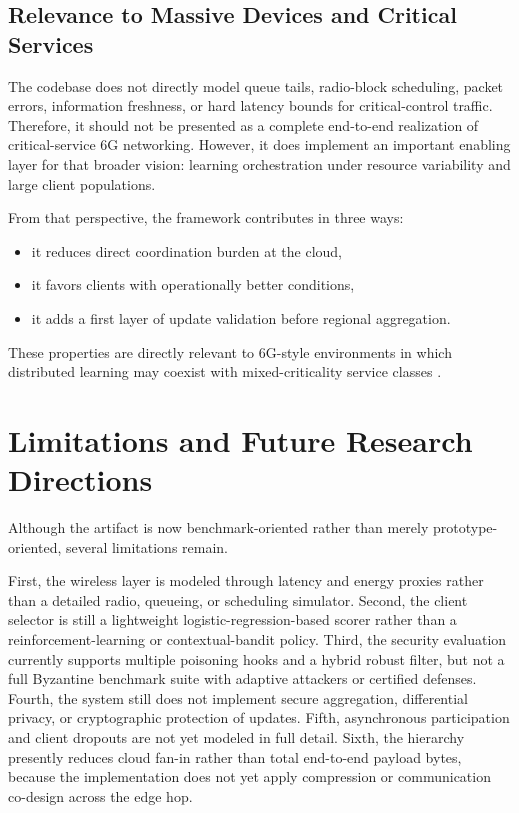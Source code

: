 \documentclass[conference]{IEEEtran}
\begin{document}
\subsection{Relevance to Massive Devices and Critical Services}
The codebase does not directly model queue tails, radio-block scheduling, packet errors, information freshness, or hard latency bounds for critical-control traffic. Therefore, it should not be presented as a complete end-to-end realization of critical-service 6G networking. However, it does implement an important enabling layer for that broader vision: learning orchestration under resource variability and large client populations.

From that perspective, the framework contributes in three ways:
\begin{itemize}
    \item it reduces direct coordination burden at the cloud,
    \item it favors clients with operationally better conditions,
    \item it adds a first layer of update validation before regional aggregation.
\end{itemize}
These properties are directly relevant to 6G-style environments in which distributed learning may coexist with mixed-criticality service classes \cite{kalor2025wireless6g}.

\section{Limitations and Future Research Directions}
Although the artifact is now benchmark-oriented rather than merely prototype-oriented, several limitations remain.

First, the wireless layer is modeled through latency and energy proxies rather than a detailed radio, queueing, or scheduling simulator. Second, the client selector is still a lightweight logistic-regression-based scorer rather than a reinforcement-learning or contextual-bandit policy. Third, the security evaluation currently supports multiple poisoning hooks and a hybrid robust filter, but not a full Byzantine benchmark suite with adaptive attackers or certified defenses. Fourth, the system still does not implement secure aggregation, differential privacy, or cryptographic protection of updates. Fifth, asynchronous participation and client dropouts are not yet modeled in full detail. Sixth, the hierarchy presently reduces cloud fan-in rather than total end-to-end payload bytes, because the implementation does not yet apply compression or communication co-design across the edge hop.
\end{document}
